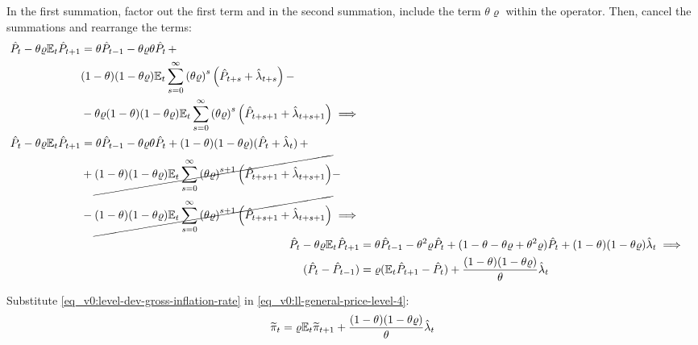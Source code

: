 \documentclass[
thesis.tex
]{subfiles}
\begin{document}
	In the first summation, factor out the first term and in the second summation, include the term $\theta \varrho$ within the operator. Then, cancel the summations and rearrange the terms:
	\begin{align}
		\begin{split}
			\hat{P}_t - \theta \varrho {\mathbb{E}_{t}} \hat{P}_{t+1} &= \theta \hat{P}_{t-1} - \theta \varrho \theta \hat{P}_t \, + \\
			& (1-\theta) (1- \theta \varrho) {\mathbb{E}_{t}} \sum_{s=0}^{\infty} \left( \theta \varrho \right)^s \left( \hat{P}_{t+s} + \hat{\lambda}_{t+s} \right) -
			\\
			& - \theta \varrho (1-\theta) (1- \theta \varrho) {\mathbb{E}_{t}} \sum_{s=0}^{\infty} \left( \theta \varrho \right)^s \left( \hat{P}_{t+s+1} + \hat{\lambda}_{t+s+1} \right) \implies \nonumber 
		\end{split} \\
		\begin{split}
			\hat{P}_t - \theta \varrho {\mathbb{E}_{t}} \hat{P}_{t+1} &= \theta \hat{P}_{t-1} - \theta \varrho \theta \hat{P}_t + (1-\theta) (1- \theta \varrho) (\hat{P}_t + \hat{\lambda}_t) \, + 
			\\
			& + \cancel{(1-\theta) (1- \theta \varrho) {\mathbb{E}_{t}} \sum_{s=0}^{\infty} \left( \theta \varrho \right)^{s+1} \left( \hat{P}_{t+s+1} + \hat{\lambda}_{t+s+1} \right)} -
			\\
			& - \cancel{(1-\theta) (1- \theta \varrho) {\mathbb{E}_{t}} \sum_{s=0}^{\infty} \left( \theta \varrho \right)^{s+1} \left( \hat{P}_{t+s+1} + \hat{\lambda}_{t+s+1} \right)} \implies \nonumber 
		\end{split} \\
		\hat{P}_t - \theta \varrho {\mathbb{E}_{t}} \hat{P}_{t+1} &= \theta \hat{P}_{t-1} - \theta^2 \varrho \hat{P}_t + (1- \theta -\theta \varrho + \theta^2 \varrho) \hat{P}_t + (1-\theta) (1- \theta \varrho) \hat{\lambda}_t \implies \nonumber \\
		(\hat{P}_t - \hat{P}_{t-1}) &= \varrho ({\mathbb{E}_{t}} \hat{P}_{t+1} - \hat{P}_t) + \frac{(1-\theta) (1- \theta \varrho)}{\theta} \hat{\lambda}_t
		\label{eq_v0:ll-general-price-level-4}
	\end{align}
	
	Substitute \ref{eq_v0:level-dev-gross-inflation-rate} in \ref{eq_v0:ll-general-price-level-4}:
	\begin{align}
		\widetilde{\pi}_t = \varrho {\mathbb{E}_{t}} \widetilde{\pi}_{t+1} + \frac{(1-\theta) (1- \theta \varrho)}{\theta} \hat{\lambda}_t \label{eq_v0:nk-phillips-curve-mc}
	\end{align}
	
\end{document}
